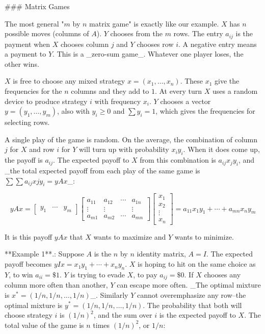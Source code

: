 

### Matrix Games

The most general "\(m\) by \(n\) matrix game" is exactly like our example. \(X\) has \(n\) possible moves (columns of \(A\)). \(Y\) chooses from the \(m\) rows. The entry \(a_{ij}\) is the payment when \(X\) chooses column \(j\) and \(Y\) chooses row \(i\). A negative entry means a payment to \(Y\). This is a _zero-sum game_. Whatever one player loses, the other wins.

\(X\) is free to choose any mixed strategy \(x=(x_{1},\ldots,x_{n})\). These \(x_{1}\) give the frequencies for the \(n\) columns and they add to \(1\). At every turn \(X\) uses a random device to produce strategy \(i\) with frequency \(x_{i}\). \(Y\) chooses a vector \(y=(y_{1},\ldots,y_{m})\), also with \(y_{i}\geq 0\) and \(\sum y_{i}=1\), which gives the frequencies for selecting rows.

A single play of the game is random. On the average, the combination of column \(j\) for \(X\) and row \(i\) for \(Y\) will turn up with probability \(x_{i}y_{i}\). When it does come up, the payoff is \(a_{ij}\). The expected payoff to \(X\) from this combination is \(a_{ij}x_{j}y_{i}\), and _the total expected payoff from each play of the same game is \(\sum\sum a_{ij}xjy_{i}=yAx\)_:

\[yAx=\begin{bmatrix}y_{1}&\cdots&y_{m}\end{bmatrix}\begin{bmatrix}a_{11}&a_{12 }&\cdots&a_{1n}\\ \vdots&\vdots&&\vdots\\ a_{m1}&a_{m2}&\cdots&a_{mn}\end{bmatrix}\begin{bmatrix}x_{1}\\ x_{2}\\ \vdots\\ x_{n}\end{bmatrix}=a_{11}x_{1}y_{1}+\cdots+a_{mn}x_{n}y_{m}\]

It is this payoff \(yAx\) that \(X\) wants to maximize and \(Y\) wants to minimize.

**Example 1**.: Suppose \(A\) is the \(n\) by \(n\) identity matrix, \(A=I\). The expected payoff becomes \(yIx=x_{1}y_{1}+\cdots+x_{n}y_{n}\). \(X\) is hoping to hit on the same choice as \(Y\), to win \(a_{ii}=\$1\). \(Y\) is trying to evade \(X\), to pay \(a_{ij}=\$0\). If \(X\) chooses any column more often than another, \(Y\) can escape more often. _The optimal mixture is \(x^{*}=(1/n,1/n,\ldots,1/n)\)_. Similarly \(Y\) cannot overemphasize any row--the optimal mixture is \(y^{*}=(1/n,1/n,\ldots,1/n)\). The probability that both will choose strategy \(i\) is \((1/n)^{2}\), and the sum over \(i\) is the expected payoff to \(X\). The total value of the game is \(n\) times \((1/n)^{2}\), or \(1/n\):

